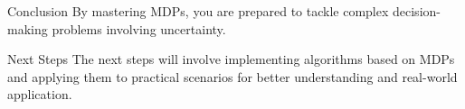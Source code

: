 \documentclass[aspectratio=169]{beamer}
\begin{document}
\begin{frame}[fragile]{Conclusion}
    By mastering MDPs, you are prepared to tackle complex decision-making problems involving uncertainty. 

    \begin{block}{Next Steps}
        The next steps will involve implementing algorithms based on MDPs and applying them to practical scenarios for better understanding and real-world application.
    \end{block}
\end{frame}
\end{document}
